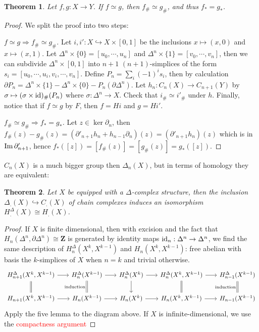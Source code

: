 \documentclass[11pt]{article}
\theoremstyle{definition}
\theoremstyle{plain}
\newtheorem{theorem}{Theorem}[section]
\newcommand{\id}{\textup{id}}
\newcommand{\im}{\textup{Im}\,}
\newcommand{\Z}{\mathbf{Z}}
\newcommand{\1}{\mathbf{1}}
\begin{document}
\begin{theorem}
Let $f,g:X\to Y$. If $f\simeq g$, then $f_\#\simeq g_\#$, and thus $f_\ast=g_\ast$.
\end{theorem}
\begin{proof}
We split the proof into two steps:\medbreak

\textit{$f\simeq g\Rightarrow f_\#\simeq g_\#$.} Let $i,i':X\hookrightarrow X\times[0,1]$ be the inclusions $x\mapsto(x,0)$ and $x\mapsto(x,1)$. Let $\Delta^n\times\{0\}=[u_0,\cdots,u_n]$ and $\Delta^n\times\{1\}=[v_0,\cdots,v_n]$, then we can subdivide $\Delta^n\times[0,1]$ into $n+1$ $(n+1)$-simplices of the form $s_i=[u_0,\cdots,u_i,v_i,\cdots,v_n]$. Define $P_n=\sum_i(-1)^is_i$, then by calculation $\partial P_n=\Delta^n\times\{1\}-\Delta^n\times\{0\}-P_n(\partial\Delta^n)$. Let $h_n:C_n(X)\to C_{n+1}(Y)$ by $\sigma\mapsto(\sigma\times\id)_\#(P_n)$ where $\sigma:\Delta^n\to X$. Check that $i_\#\simeq i'_\#$ under $h$. Finally, notice that if $f\simeq g$ by $F$, then $f=Hi$ and $g=Hi'$.\medbreak

\textit{$f_\#\simeq g_\#\Rightarrow f_\ast=g_\ast$.} Let $z\in\ker\partial_n$, then $f_\#(z)-g_\#(z)=(\partial'_{n+1}h_n+h_{n-1}\partial_n)(z)=(\partial'_{n+1}h_n)(z)$ which is in $\im\partial'_{n+1}$, hence $f_\ast([z])=[f_\#(z)]=[g_\#(z)]=g_\ast([z])$.
\end{proof}

$C_n(X)$ is a much bigger group then $\Delta_n(X)$, but in terms of homology they are equivalent:

\begin{theorem}
Let $X$ be equipped with a $\Delta$-complex structure, then the inclusion $\Delta_.(X)\hookrightarrow C_.(X)$ of chain complexes induces an isomorphism $H_.^\Delta(X)\cong H_.(X)$.
\end{theorem}
\begin{proof}
If $X$ is finite dimensional, then with excision and the fact that $H_n(\Delta^n,\partial\Delta^n)\cong\Z$ is generated by identity maps $\id_n:\Delta^n\to\Delta^n$, we find the same description of $H_n^\Delta(X^k,X^{k-1})$ and $H_n(X^k,X^{k-1})$: free abelian with basis the $k$-simplices of $X$ when $n=k$ and trivial otherwise.
\[\begin{tikzcd}[column sep=scriptsize]
H^\Delta_{n+1}(X^k,X^{k-1})\arrow[d,equal]\arrow[r]&H^\Delta_n(X^{k-1})\arrow[d,equal,"\textrm{induction}"']\arrow[r]&H^\Delta_n(X^k)\arrow[d]\arrow[r]&H^\Delta_n(X^k,X^{k-1})\arrow[d,equal]\arrow[r]&H^\Delta_{n-1}(X^{k-1})\arrow[d,equal,"\textrm{induction}"']\\
H_{n+1}(X^k,X^{k-1})\arrow[r]&H_n(X^{k-1})\arrow[r]&H_n(X^k)\arrow[r]&H_n(X^k,X^{k-1})\arrow[r]&H_{n-1}(X^{k-1})
\end{tikzcd}\]
Apply the five lemma to the diagram above. If $X$ is infinite-dimensional, we use the \textcolor{red}{compactness argument}
\end{proof}
\end{document}
